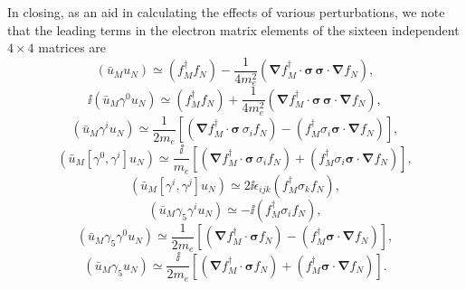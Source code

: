 In closing, as an aid in calculating the effects of various perturbations, we
note that the leading terms in the electron matrix elements of the sixteen
independent $4\times4$ matrices are
\begin{equation}
 (\bar u_Mu_N)\simeq(f_M^\dagger f_N)
 -\frac1{4m_e^2}(\boldsymbol\nabla f_M^\dagger\cdot\boldsymbol\sigma\,
 \boldsymbol\sigma\cdot\boldsymbol\nabla f_N),
 \tag{14.1.40}\label{eq:14.1.40}
\end{equation}
\begin{equation}
 \ii(\bar u_M\gamma^0u_N)\simeq(f_M^\dagger f_N)
 +\frac1{4m_e^2}(\boldsymbol\nabla f_M^\dagger\cdot\boldsymbol\sigma\,
 \boldsymbol\sigma\cdot\boldsymbol\nabla f_N),
 \tag{14.1.41}\label{eq:14.1.41}
\end{equation}
\begin{equation}
 (\bar u_M\gamma^iu_N)\simeq\frac1{2m_e}
 \left[(\boldsymbol\nabla f_M^\dagger\cdot\boldsymbol\sigma\,\sigma_i f_N)
 -(f_M^\dagger\sigma_i\boldsymbol\sigma\cdot\boldsymbol\nabla f_N)\right],
 \tag{14.1.42}\label{eq:14.1.42}
\end{equation}
\begin{equation}
 (\bar u_M[\gamma^0,\gamma^i]u_N)\simeq\frac{\ii}{m_e}
 \left[(\boldsymbol\nabla f_M^\dagger\cdot\boldsymbol\sigma\,\sigma_i f_N)
 +(f_M^\dagger\sigma_i\boldsymbol\sigma\cdot\boldsymbol\nabla f_N)\right],
 \tag{14.1.43}\label{eq:14.1.43}
\end{equation}
\begin{equation}
 (\bar u_M[\gamma^i,\gamma^j]u_N)\simeq
 2\ii\epsilon_{ijk}(f_M^\dagger\sigma_kf_N),
 \tag{14.1.44}\label{eq:14.1.44}
\end{equation}
\begin{equation}
 (\bar u_M\gamma_5\gamma^iu_N)\simeq-\ii(f_M^\dagger\sigma_if_N),
 \tag{14.1.45}\label{eq:14.1.45}
\end{equation}
\begin{equation}
 (\bar u_M\gamma_5\gamma^0u_N)\simeq\frac1{2m_e}
 \left[(\boldsymbol\nabla f_M^\dagger\cdot\boldsymbol\sigma f_N)
 -(f_M^\dagger\boldsymbol\sigma\cdot\boldsymbol\nabla f_N)\right],
 \tag{14.1.46}\label{eq:14.1.46}
\end{equation}
\begin{equation}
 (\bar u_M\gamma_5u_N)\simeq\frac{\ii}{2m_e}
 \left[(\boldsymbol\nabla f_M^\dagger\cdot\boldsymbol\sigma f_N)
 +(f_M^\dagger\boldsymbol\sigma\cdot\boldsymbol\nabla f_N)\right].
 \tag{14.1.47}\label{eq:14.1.47}
\end{equation}
